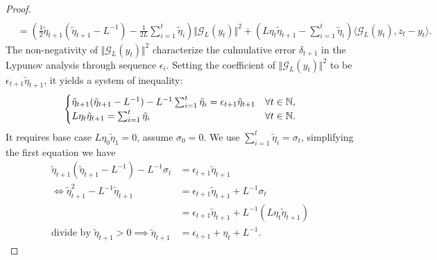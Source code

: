 \documentclass[12pt]{article}
\begin{document}
\begin{proof}
{\begin{align*}
            \\
            &= 
            \left(
                \frac{1}{2}\tilde\eta_{t + 1}\left(
                    \tilde \eta_{t +1} - L^{-1}
                \right)
                - 
                \frac{1}{2L}\sum_{i = 1}^{t}\tilde \eta_i
            \right)\Vert \mathcal G_L(y_t)\Vert^2 + 
            \left(
                L\eta_t \tilde \eta_{t + 1} - \sum_{i = 1}^{t}\tilde \eta_i
            \right)\langle \mathcal G_L(y_t), z_t - y_t\rangle. 
        \end{align*}
        }
        The non-negativity of $\Vert \mathcal G_L(y_t) \Vert^2$ characterize the culmulative error $\delta_{t + 1}$ in the Lypunov analysis through sequence $\epsilon_i$. 
        Setting the coefficient of $\Vert \mathcal G_L(y_t) \Vert^2$ to be $\epsilon_{t + 1}\tilde \eta_{t + 1}$, it yields a system of inequality: 
        \begin{align*}
            \begin{cases}
                \tilde \eta_{t + 1} (\tilde \eta_{t + 1} - L^{-1})
                - L^{-1} \sum_{i= 1}^{t}\tilde \eta_i 
                = 
                \epsilon_{t + 1} \tilde \eta_{t + 1}
                & \forall t \in \mathbb N, 
                \\
                L \eta_t \tilde \eta_{t + 1} = \sum_{i=1}^{t}\tilde \eta_i 
                & \forall t \in \mathbb N. 
            \end{cases}
        \end{align*}
        It requires base case $L\eta_0\tilde\eta_{1} = 0$, assume $\sigma_0 = 0$. 
        We use $\sum_{i = 1}^t \tilde \eta_i = \sigma_t$, simplifying the first equation we have 
        \begin{align*}
            \tilde \eta_{t + 1} (\tilde \eta_{t + 1} - L^{-1})
            - L^{-1} \sigma_t
            &= 
            \epsilon_{t + 1} \tilde \eta_{t + 1}
            \\
            \iff 
            \tilde \eta_{t + 1} ^2 - L^{-1} \tilde \eta_{t + 1} 
            &= 
            \epsilon_{t + 1} \tilde \eta_{t + 1} + L^{-1} \sigma_t
            \\
            &= 
            \epsilon_{t + 1} \tilde \eta_{t + 1} 
            + L^{-1}(L \eta_t \tilde \eta_{t + 1})
            \\
            \text{divide by } \tilde \eta_{t + 1} > 0
            \implies 
            \tilde \eta_{t + 1} &= \epsilon_{t + 1} + \eta_t + L^{-1}. 
        \end{align*}

\end{proof}
\end{document}
